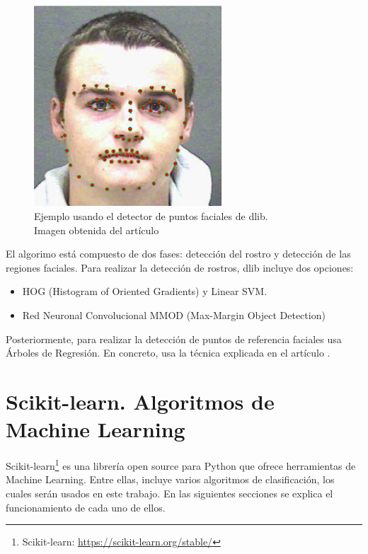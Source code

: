 \begin{figure} [h!]
  \begin{center}
    \includegraphics[width=7cm]{figs/dlib_example.png}
  \end{center}
  \captionsetup{justification=centering}
  \caption{Ejemplo usando el detector de puntos faciales de dlib.\\
  Imagen obtenida del artículo \cite{dlib_example}}
  \label{fig:dlib_example}
\end{figure}

El algorimo está compuesto de dos fases: detección del rostro y detección de las regiones faciales. Para realizar la detección de rostros, dlib incluye dos opciones:

\begin{itemize}
    \item HOG (Histogram of Oriented Gradients) y Linear SVM.
    \item Red Neuronal Convolucional MMOD (Max-Margin Object Detection)
\end{itemize}

Posteriormente, para realizar la detección de puntos de referencia faciales usa Árboles de Regresión. En concreto, usa la técnica explicada en el artículo \cite{facial_landmarks_dlib}.

\section{Scikit-learn. Algoritmos de Machine Learning}

Scikit-learn\footnote{Scikit-learn: \url{https://scikit-learn.org/stable/}} es una librería open source para Python que ofrece herramientas de Machine Learning. Entre ellas, incluye varios algoritmos de clasificación, los cuales serán usados en este trabajo. En las siguientes secciones se explica el funcionamiento de cada uno de ellos.

